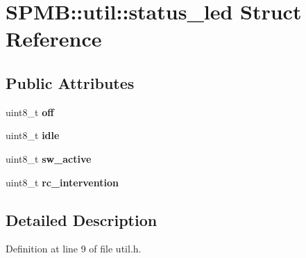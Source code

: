 \hypertarget{structSPMB_1_1util_1_1status__led}{}\section{S\+P\+MB\+:\+:util\+:\+:status\+\_\+led Struct Reference}
\label{structSPMB_1_1util_1_1status__led}
\subsection*{Public Attributes}
\begin{DoxyCompactItemize}
\item 
uint8\+\_\+t {\bfseries off}\hypertarget{structSPMB_1_1util_1_1status__led_a6662fee00d36e8d23af9b00698b8193d}{}\label{structSPMB_1_1util_1_1status__led_a6662fee00d36e8d23af9b00698b8193d}

\item 
uint8\+\_\+t {\bfseries idle}\hypertarget{structSPMB_1_1util_1_1status__led_a9d7721d4c0c9948dce7df3415fdf836c}{}\label{structSPMB_1_1util_1_1status__led_a9d7721d4c0c9948dce7df3415fdf836c}

\item 
uint8\+\_\+t {\bfseries sw\+\_\+active}\hypertarget{structSPMB_1_1util_1_1status__led_a647beef9900026e1e516d456a111d5ad}{}\label{structSPMB_1_1util_1_1status__led_a647beef9900026e1e516d456a111d5ad}

\item 
uint8\+\_\+t {\bfseries rc\+\_\+intervention}\hypertarget{structSPMB_1_1util_1_1status__led_a1406160f915db22880b02941cbbc49fb}{}\label{structSPMB_1_1util_1_1status__led_a1406160f915db22880b02941cbbc49fb}

\end{DoxyCompactItemize}


\subsection{Detailed Description}


Definition at line 9 of file util.\+h.

